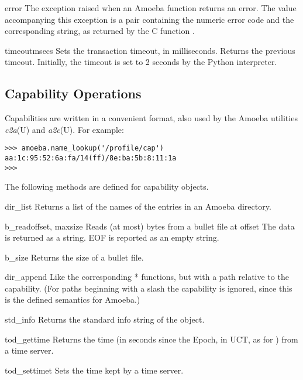 \begin{excdesc}{error}
The exception raised when an Amoeba function returns an error.
The value accompanying this exception is a pair containing the numeric
error code and the corresponding string, as returned by the C function
.
\end{excdesc}

\begin{funcdesc}{timeout}{msecs}
Sets the transaction timeout, in milliseconds.
Returns the previous timeout.
Initially, the timeout is set to 2 seconds by the Python interpreter.
\end{funcdesc}

\subsection{Capability Operations}

Capabilities are written in a convenient \ASCII{} format, also used by the
Amoeba utilities
\emph{c2a}(U)
and
\emph{a2c}(U).
For example:

\begin{verbatim}
>>> amoeba.name_lookup('/profile/cap')
aa:1c:95:52:6a:fa/14(ff)/8e:ba:5b:8:11:1a
>>> 
\end{verbatim}
%
The following methods are defined for capability objects.

\begin{methoddesc}[capability]{dir_list}{}
Returns a list of the names of the entries in an Amoeba directory.
\end{methoddesc}

\begin{methoddesc}[capability]{b_read}{offset, maxsize}
Reads (at most)
bytes from a bullet file at offset
The data is returned as a string.
EOF is reported as an empty string.
\end{methoddesc}

\begin{methoddesc}[capability]{b_size}{}
Returns the size of a bullet file.
\end{methoddesc}

\begin{methoddesc}[capability]{dir_append}{}
Like the corresponding
*
functions, but with a path relative to the capability.
(For paths beginning with a slash the capability is ignored, since this
is the defined semantics for Amoeba.)
\end{methoddesc}

\begin{methoddesc}[capability]{std_info}{}
Returns the standard info string of the object.
\end{methoddesc}

\begin{methoddesc}[capability]{tod_gettime}{}
Returns the time (in seconds since the Epoch, in UCT, as for \POSIX) from
a time server.
\end{methoddesc}

\begin{methoddesc}[capability]{tod_settime}{t}
Sets the time kept by a time server.
\end{methoddesc}
